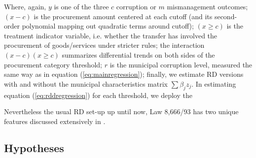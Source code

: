 \documentclass[11pt]{article}
\newcommand{\hypopen}{Comparing procurement calls}
\begin{document}
Where, again, $y$ is one of the three $c$ corruption or $m$ mismanagement outcomes; $(x - c)$ is the procurement amount centered at each cutoff (and its second-order polynomial mapping out quadratic terms around cutoff); $(x \geq c)$ is the treatment indicator variable, i.e. whether the transfer has involved the procurement of goods/services under stricter rules; the interaction $(x - c)(x \geq c)$ summarizes differential trends on both sides of the procurement category threshold; $r$ is the municipal corruption level, measured the same way as in equation (\ref{eq:mainregression}); finally, we estimate RD versions with and without the municipal characteristics matrix $\sum \beta_{j} z_{j}$. In estimating equation (\ref{eq:rddregression}) for each threshold, we deploy the

Nevertheless the usual RD set-up up until now, Law 8,666/93 has two unique features discussed extensively in \citet{CattaneoInterpretingRegressionDiscontinuity2016}.


\subsection{Hypotheses} \label{subsec:hypotheses}


\end{document}
